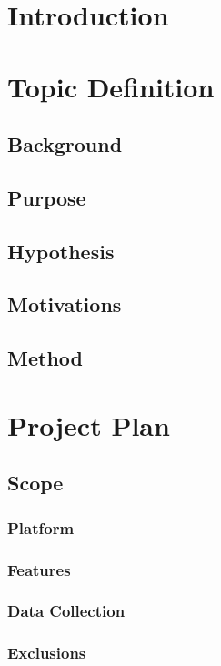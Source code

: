\documentclass[a4paper]{article}
\begin{document}
\tableofcontents
\newpage

\section{Introduction}


\section{Topic Definition}
\subsection{Background}

\subsection{Purpose}
\subsection{Hypothesis}
\subsection{Motivations}
\subsection{Method}

\section{Project Plan}
\subsection{Scope}
\subsubsection{Platform}
\subsubsection{Features}
\subsubsection{Data Collection}

\subsubsection{Exclusions}
\end{document}
